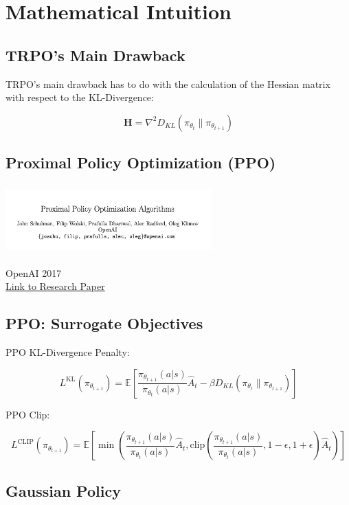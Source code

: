 \documentclass[
  letterpaper,
  DIV=11,
  numbers=noendperiod]{scrreprt}
\begin{document}
\section{Mathematical Intuition}\label{mathematical-intuition-3}

\subsection{TRPO's Main Drawback}\label{trpos-main-drawback}

TRPO's main drawback has to do with the calculation of the Hessian
matrix with respect to the KL-Divergence:

\[
\mathbf{H} = \nabla^2 D_{KL}(\pi_{\theta_{t}} \| \pi_{\theta_{t+1}})
\]

\subsection{Proximal Policy Optimization
(PPO)}\label{proximal-policy-optimization-ppo-1}

\includegraphics[width=3.125in,height=1.04167in]{lecture10/images/PPO.png}

OpenAI 2017\\
\href{https://arxiv.org/pdf/1707.06347}{Link to Research Paper}

\subsection{PPO: Surrogate Objectives}\label{ppo-surrogate-objectives}

PPO KL-Divergence Penalty:

\[
L^{\text{KL}}(\pi_{\theta_{t+1}}) = \mathbb{E} \left[ \frac{\pi_{\theta_{t+1}}(a|s)}{\pi_{\theta_{t}}(a|s)} \hat{A}_t - \beta D_{KL}(\pi_{\theta_{t}} \| \pi_{\theta_{t+1}}) \right]
\]

PPO Clip:

\[
L^{\text{CLIP}}(\pi_{\theta_{t+1}}) = \mathbb{E} \left[ \min \left( \frac{\pi_{\theta_{t+1}}(a|s)}{\pi_{\theta_{t}}(a|s)} \hat{A}_t, \text{clip}\left(\frac{\pi_{\theta_{t+1}}(a|s)}{\pi_{\theta_{t}}(a|s)}, 1-\epsilon, 1+\epsilon\right) \hat{A}_t \right) \right]
\]

\subsection{Gaussian Policy}\label{gaussian-policy}
\end{document}
